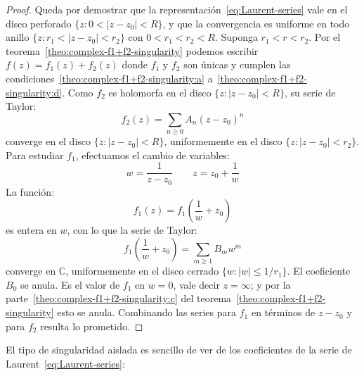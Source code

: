 \begin{proof}
    Queda por demostrar
    que la representación~\eqref{eq:Laurent-series}
    vale en el disco perforado
    \(\{ z \colon 0 < \lvert z - z_0 \rvert < R \}\),
    y que la convergencia es uniforme en todo anillo
    \(\{ z \colon r_1 < \lvert z - z_0 \rvert < r_2 \}\)
    con \(0 < r_1 < r_2 < R\).
    Suponga \(r_1 < r < r_2\).
    Por el teorema~\ref{theo:complex-f1+f2-singularity}
    podemos escribir \(f(z) = f_1(z) + f_2(z)\)
    donde \(f_1\) y \(f_2\) son únicas
    y cumplen las condiciones~\ref{theo:complex-f1+f2-singularity:a}
    a~\ref{theo:complex-f1+f2-singularity:d}.
    Como \(f_2\) es holomorfa en el disco
      \(\{ z \colon \lvert z - z_0 \rvert < R \}\),
    su serie de Taylor:
    \begin{equation*}
      f_2(z)
	= \sum_{n \ge 0} A_n (z - z_0)^n
    \end{equation*}
    converge
    en el disco \(\{ z \colon \lvert z - z_0 \rvert < R \}\),
    uniformemente
    en el disco \(\{ z \colon \lvert z - z_0 \rvert < r_2 \}\).
    Para estudiar \(f_1\),
    efectuamos el cambio de variables:
    \begin{equation*}
      w = \frac{1}{z - z_0}
      \qquad
      z = z_0 + \frac{1}{w}
    \end{equation*}
    La función:
    \begin{equation*}
      f_1(z)
	= f_1 \left( \frac{1}{w} + z_0 \right)
    \end{equation*}
    es entera en \(w\),
    con lo que la serie de Taylor:%
    \begin{equation*}
      f_1 \left( \frac{1}{w} + z_0 \right)
	= \sum_{m \ge 1} B_m w^m
    \end{equation*}
    converge en \(\mathbb{C}\),
    uniformemente en el disco cerrado
      \(\{ w \colon \lvert w \rvert \le 1 / r_1 \}\).
    El coeficiente \(B_0\) se anula.
    Es el valor de \(f_1\) en \(w = 0\),
    vale decir \(z = \infty\);
    y por la parte~\ref{theo:complex-f1+f2-singularity:c}
    del teorema~\ref{theo:complex-f1+f2-singularity}
    esto se anula.
    Combinando las series para \(f_1\) en términos de \(z - z_0\)
    y para \(f_2\)
    resulta lo prometido.
  \end{proof}
  El tipo de singularidad aislada
  es sencillo de ver de los coeficientes
  de la serie de Laurent~\eqref{eq:Laurent-series}:
